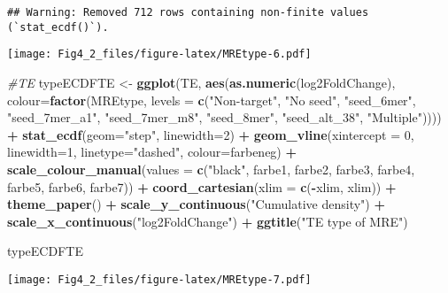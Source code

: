 \documentclass[
]{article}
\newenvironment{Shaded}{\begin{snugshade}}{\end{snugshade}}
\newcommand{\AttributeTok}[1]{\textcolor[rgb]{0.13,0.29,0.53}{#1}}
\newcommand{\CommentTok}[1]{\textcolor[rgb]{0.56,0.35,0.01}{\textit{#1}}}
\newcommand{\DecValTok}[1]{\textcolor[rgb]{0.00,0.00,0.81}{#1}}
\newcommand{\FunctionTok}[1]{\textcolor[rgb]{0.13,0.29,0.53}{\textbf{#1}}}
\newcommand{\NormalTok}[1]{#1}
\newcommand{\OtherTok}[1]{\textcolor[rgb]{0.56,0.35,0.01}{#1}}
\newcommand{\SpecialCharTok}[1]{\textcolor[rgb]{0.81,0.36,0.00}{\textbf{#1}}}
\newcommand{\StringTok}[1]{\textcolor[rgb]{0.31,0.60,0.02}{#1}}
\begin{document}
\begin{verbatim}
## Warning: Removed 712 rows containing non-finite values (`stat_ecdf()`).
\end{verbatim}

\texttt{[image: Fig4\_2\_files/figure-latex/MREtype-6.pdf]}

\begin{Shaded}
\begin{Highlighting}[]
\CommentTok{\#TE}
\NormalTok{typeECDFTE }\OtherTok{\textless{}{-}} \FunctionTok{ggplot}\NormalTok{(TE, }\FunctionTok{aes}\NormalTok{(}\FunctionTok{as.numeric}\NormalTok{(log2FoldChange), }
                              \AttributeTok{colour=}\FunctionTok{factor}\NormalTok{(MREtype, }\AttributeTok{levels =} \FunctionTok{c}\NormalTok{(}\StringTok{"Non{-}target"}\NormalTok{, }\StringTok{"No seed"}\NormalTok{, }\StringTok{"seed\_6mer"}\NormalTok{, }\StringTok{"seed\_7mer\_a1"}\NormalTok{, }\StringTok{"seed\_7mer\_m8"}\NormalTok{, }\StringTok{"seed\_8mer"}\NormalTok{, }\StringTok{"seed\_alt\_38"}\NormalTok{, }\StringTok{"Multiple"}\NormalTok{)))) }\SpecialCharTok{+} 
  \FunctionTok{stat\_ecdf}\NormalTok{(}\AttributeTok{geom=}\StringTok{"step"}\NormalTok{, }\AttributeTok{linewidth=}\DecValTok{2}\NormalTok{) }\SpecialCharTok{+}
  \FunctionTok{geom\_vline}\NormalTok{(}\AttributeTok{xintercept =} \DecValTok{0}\NormalTok{, }\AttributeTok{linewidth=}\DecValTok{1}\NormalTok{, }\AttributeTok{linetype=}\StringTok{"dashed"}\NormalTok{, }\AttributeTok{colour=}\NormalTok{farbeneg) }\SpecialCharTok{+}
  \FunctionTok{scale\_colour\_manual}\NormalTok{(}\AttributeTok{values =} \FunctionTok{c}\NormalTok{(}\StringTok{"black"}\NormalTok{, farbe1, farbe2, farbe3, farbe4, farbe5, farbe6, farbe7)) }\SpecialCharTok{+}
  \FunctionTok{coord\_cartesian}\NormalTok{(}\AttributeTok{xlim =} \FunctionTok{c}\NormalTok{(}\SpecialCharTok{{-}}\NormalTok{xlim, xlim)) }\SpecialCharTok{+} 
  \FunctionTok{theme\_paper}\NormalTok{() }\SpecialCharTok{+}
  \FunctionTok{scale\_y\_continuous}\NormalTok{(}\StringTok{"Cumulative density"}\NormalTok{) }\SpecialCharTok{+} \FunctionTok{scale\_x\_continuous}\NormalTok{(}\StringTok{"log2FoldChange"}\NormalTok{) }\SpecialCharTok{+}
  \FunctionTok{ggtitle}\NormalTok{(}\StringTok{"TE type of MRE"}\NormalTok{)}

\NormalTok{typeECDFTE}
\end{Highlighting}
\end{Shaded}

\texttt{[image: Fig4\_2\_files/figure-latex/MREtype-7.pdf]}
\end{document}
